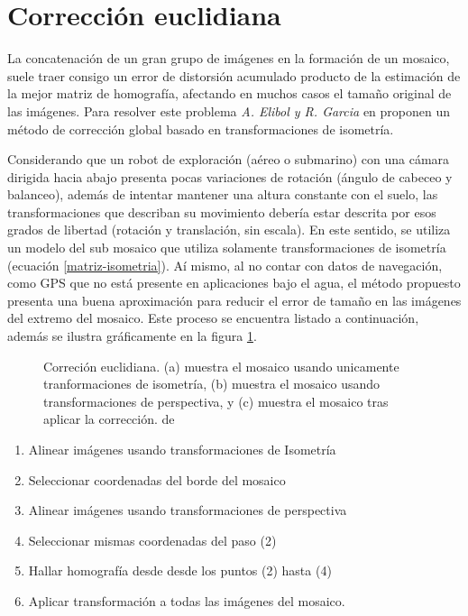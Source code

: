 \section{Corrección euclidiana}

La concatenación de un gran grupo de imágenes en la formación de un mosaico, suele traer consigo un error de distorsión acumulado producto de la estimación de la mejor matriz de homografía, afectando en muchos casos el tamaño original de las imágenes. Para resolver este problema \textit{A. Elibol y R. Garcia} en \cite{elibol} proponen un método de corrección global basado en transformaciones de isometría.

Considerando que un robot de exploración (aéreo o submarino) con una cámara dirigida hacia abajo presenta pocas variaciones de rotación (ángulo de cabeceo y balanceo), además de intentar mantener una altura constante con el suelo, las transformaciones que describan su movimiento debería estar descrita por esos grados de libertad (rotación y translación, sin escala). En este sentido, se utiliza un modelo del sub mosaico que utiliza solamente transformaciones de isometría (ecuación \ref{matriz-isometria}). Aí mismo, al no contar con datos de navegación, como GPS que no está presente en aplicaciones bajo el agua, el método propuesto presenta una buena aproximación para reducir el error de tamaño en las imágenes del extremo del mosaico. Este proceso se encuentra listado a continuación, además se ilustra gráficamente en la figura \ref{imagen:correcion-e}.
\begin{figure}[h]
	\centering     %
	\hspace{5mm}%
	\caption[Correción euclidiana]{Correción euclidiana. (a) muestra el mosaico usando unicamente tranformaciones de isometría, (b) muestra el mosaico usando transformaciones de perspectiva, y (c) muestra el mosaico tras aplicar la corrección. de \cite{elibol}}
	
	\label{imagen:correcion-e}
\end{figure}
\begin{enumerate}%
	\item Alinear imágenes usando transformaciones de Isometría
	\item Seleccionar coordenadas del borde del mosaico
	\item Alinear imágenes usando transformaciones de perspectiva
	\item Seleccionar mismas coordenadas del paso (2)
	\item Hallar homografía desde desde los puntos (2) hasta (4)
	\item Aplicar transformación a todas las imágenes del mosaico.
\end{enumerate}


